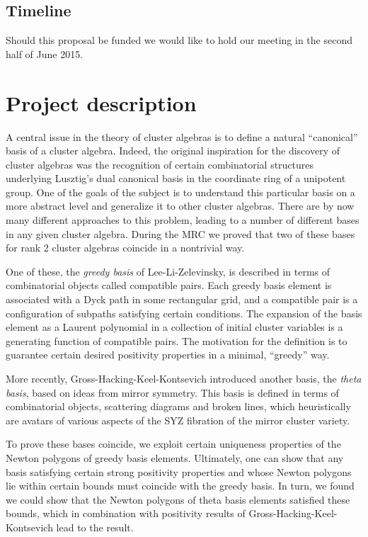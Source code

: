 \documentclass{amsart}
\begin{document}
  \subsection*{Timeline} 
    Should this proposal be funded we would like to hold our meeting in the
    second half of June 2015.

  \section*{Project description}

    A central issue in the theory of cluster algebras is to define a natural
    ``canonical'' basis of a cluster algebra.
    Indeed, the original inspiration for the discovery of cluster algebras was
    the recognition of certain combinatorial structures underlying Lusztig's
    dual canonical basis in the coordinate ring of a unipotent group.
    One of the goals of the subject is to understand this particular basis on a
    more abstract level and generalize it to other cluster algebras.
    There are by now many different approaches to this problem, leading to a
    number of different bases in any given cluster algebra.
    During the MRC we proved that two of these bases for rank 2 cluster algebras
    coincide in a nontrivial way.

    One of these, the \emph{greedy basis} of Lee-Li-Zelevinsky, is described in
    terms of combinatorial objects called compatible pairs.
    Each greedy basis element is associated with a Dyck path in some rectangular
    grid, and a compatible pair is a configuration of subpaths satisfying
    certain conditions.
    The expansion of the basis element as a Laurent polynomial in a collection
    of initial cluster variables is a generating function of compatible pairs.
    The motivation for the definition is to guarantee certain desired positivity
    properties in a minimal, ``greedy'' way.

    More recently, Gross-Hacking-Keel-Kontsevich introduced another basis, the
    \emph{theta basis}, based on ideas from mirror symmetry.
    This basis is defined in terms of combinatorial objects, scattering diagrams
    and broken lines, which heuristically are avatars of various aspects of the
    SYZ fibration of the mirror cluster variety.
    
    To prove these bases coincide, we exploit certain uniqueness properties of
    the Newton polygons of greedy basis elements.
    Ultimately, one can show that any basis satisfying certain strong positivity
    properties and whose Newton polygons lie within certain bounds must coincide
    with the greedy basis.
    In turn, we found we could show that the Newton polygons of theta basis
    elements satisfied these bounds, which in combination with positivity
    results of Gross-Hacking-Keel-Kontsevich lead to the result.
    
\end{document}
